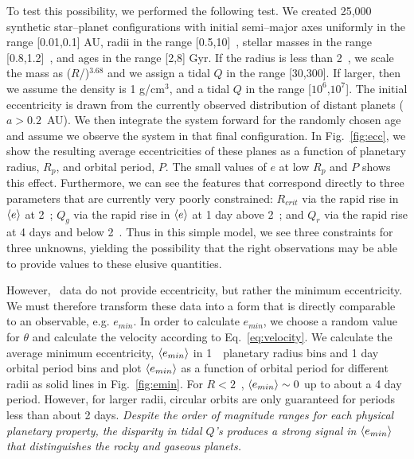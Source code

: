 To test this possibility, we performed the following test. We created
25,000 synthetic star--planet configurations with initial semi--major
axes uniformly in the range [0.01,0.1] AU, radii in the range
[0.5,10]~\rearth, stellar masses in the range [0.8,1.2]~\msun, and
ages in the range [2,8] Gyr.  If the radius is less than 2~\rearth, we
scale the mass as ($R$/\rearth)$^{3.68}$\mearth \citep{Sotin07} and we
assign a tidal $Q$ in the range [30,300].  If larger, then we assume
the density is 1 g/cm$^3$, and a tidal $Q$ in the range
[$10^6$,$10^7$].  The initial eccentricity is drawn from the currently
observed distribution of distant planets ($a > 0.2$~AU).  We then
integrate the system forward for the randomly chosen age and assume we
observe the system in that final configuration. In Fig.~\ref{fig:ecc},
we show the resulting average eccentricities of these planes as a
function of planetary radius, $R_p$, and orbital period, $P$.  The
small values of $e$ at low $R_p$ and $P$ shows this effect.
Furthermore, we can see the features that correspond directly to three
parameters that are currently very poorly constrained: $R_{crit}$ via
the rapid rise in $\left< e \right>$ at 2~\rearth; $Q_g$ via the rapid rise in
$\left< e \right>$ at 1 day above 2~\rearth; and $Q_r$ via the rapid rise at 4
days and below 2~\rearth.  Thus in this simple model, we see three
constraints for three unknowns, yielding the possibility that the
right observations may be able to provide values to these elusive
quantities.

However, \kepler~data do not provide eccentricity, but rather the
minimum eccentricity. We must therefore transform these data into a
form that is directly comparable to an observable, e.g. $e_{min}$. In
order to calculate $e_{min}$, we choose a random value for $\theta$
and calculate the velocity according to Eq.~\ref{eq:velocity}. We
calculate the average minimum eccentricity, $\left< e_{min} \right>$ in
1~\rearth~planetary radius bins and 1 day orbital period bins and plot
$\left< e_{min} \right>$ as a function of orbital period for different radii as
solid lines in Fig.~\ref{fig:emin}. For $R < 2$~\rearth, $\left< e_{min} \right>
\sim 0$ up to about a 4 day period. However, for larger radii,
circular orbits are only guaranteed for periods less than about 2
days. \textit{Despite the order of magnitude ranges for each physical
  planetary property, the disparity in tidal $Q$'s produces a strong
  signal in $\left< e_{min} \right>$ that distinguishes the rocky and gaseous
  planets. }

